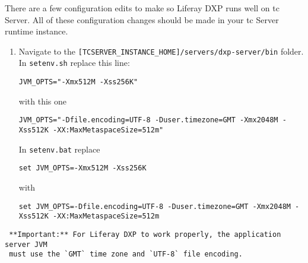 There are a few configuration edits to make so Liferay DXP runs well on
tc Server. All of these configuration changes should be made in your tc
Server runtime instance.

\begin{enumerate}
\def\labelenumi{\arabic{enumi}.}
\item
  Navigate to the
  \texttt{{[}TCSERVER\_INSTANCE\_HOME{]}/servers/dxp-server/bin} folder.
  In \texttt{setenv.sh} replace this line:

\begin{verbatim}
JVM_OPTS="-Xmx512M -Xss256K"
\end{verbatim}

  with this one

\begin{verbatim}
JVM_OPTS="-Dfile.encoding=UTF-8 -Duser.timezone=GMT -Xmx2048M -Xss512K -XX:MaxMetaspaceSize=512m"
\end{verbatim}

  In \texttt{setenv.bat} replace

\begin{verbatim}
set JVM_OPTS=-Xmx512M -Xss256K
\end{verbatim}

  with

\begin{verbatim}
set JVM_OPTS=-Dfile.encoding=UTF-8 -Duser.timezone=GMT -Xmx2048M -Xss512K -XX:MaxMetaspaceSize=512m
\end{verbatim}
\end{enumerate}

\noindent\hrulefill

\begin{verbatim}
 **Important:** For Liferay DXP to work properly, the application server JVM
 must use the `GMT` time zone and `UTF-8` file encoding.
\end{verbatim}

\noindent\hrulefill

